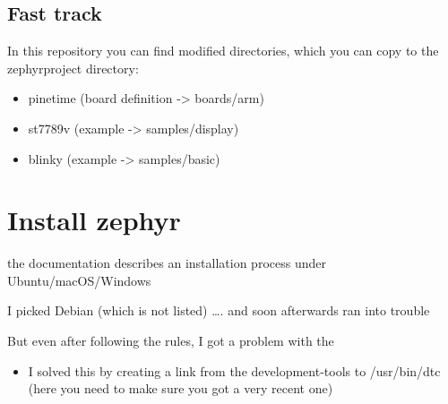 \documentclass[letterpaper,10pt,english]{sphinxmanual}
\begin{document}
\section{Fast track}
\label{\detokenize{about:fast-track}}
In this repository you can find modified directories, which you can copy to the zephyrproject directory:
\begin{itemize}
\item {} 
pinetime (board definition -\textgreater{} boards/arm)

\item {} 
st7789v (example -\textgreater{} samples/display)

\item {} 
blinky (example -\textgreater{} samples/basic)

\end{itemize}


\chapter{Install zephyr}
\label{\detokenize{installation:install-zephyr}}\label{\detokenize{installation::doc}}

the documentation describes an installation process under Ubuntu/macOS/Windows

I picked Debian (which is not listed)
…. and soon afterwards ran into trouble


But even after following the rules, I got a problem with the 
\begin{itemize}
\item {} 
I solved this by creating a link from the development-tools to /usr/bin/dtc (here you need to make sure you got a very recent one)

\end{itemize}

\begin{sphinxVerbatim}[commandchars=\\\{\}]
\end{sphinxVerbatim}

\end{document}
